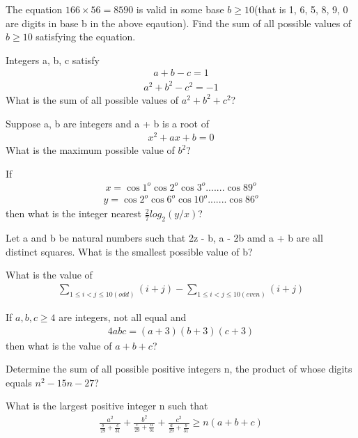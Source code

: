 \item The equation $166 \times 56 = 8590$ is valid in some base $b \geq 10$(that is 1, 6, 5, 8, 9, 0 are digits in base b in the above eqaution). Find the sum of all possible values of $b \geq 10$ satisfying the equation.

\item Integers a, b, c satisfy 
\begin{align}
a + b - c = 1
\end{align} 
\begin{align}
a^2 + b^2 - c^2 = -1
\end{align}
What is the sum of all possible values of $a^2 + b^2 + c^2$?

\item Suppose a, b are integers and a + b is a root of
\begin{align}
x^2 + ax + b = 0
\end{align}
What is the maximum possible value of $b^2$?

\item If
\begin{align*}
x = \cos1^{o} \cos2^{o} \cos3^{o}.......\cos89^{o}
\end{align*}
\begin{align*}
y = \cos2^{o} \cos6^{o} \cos10^{o}.......\cos86^{o}
\end{align*}
then what is the integer nearest $\frac{2}{7}log_2(y/x)$?

\item Let a and b be natural numbers such that 2z - b, a - 2b amd a + b are all distinct squares. What is the smallest possible value of b?

\item What is the value of
\begin{align*}
\sum_{1 \leq i < j \leq 10(odd)}^{}(i + j) - \sum_{1 \leq i < j \leq 10(even)}^{}(i + j) 
\end{align*}

\item If $a, b, c \geq 4$ are integers, not all equal and 
\begin{align*}
4abc = (a  + 3)(b + 3)(c  + 3)
\end{align*}
then what is the value of $a + b + c$?

\item Determine the sum of all possible positive integers n, the product of whose digits equals $n^2  -15n - 27$?

\item What is the largest positive integer n such that
\begin{align*}
\frac{a^2}{\frac{b}{29} + \frac{c}{31}} + \frac{b^2}{\frac{c}{29} + \frac{a}{31}} + \frac{c^2}{\frac{a}{29} + \frac{b}{31}} \geq n(a+b+c)
\end{align*}

